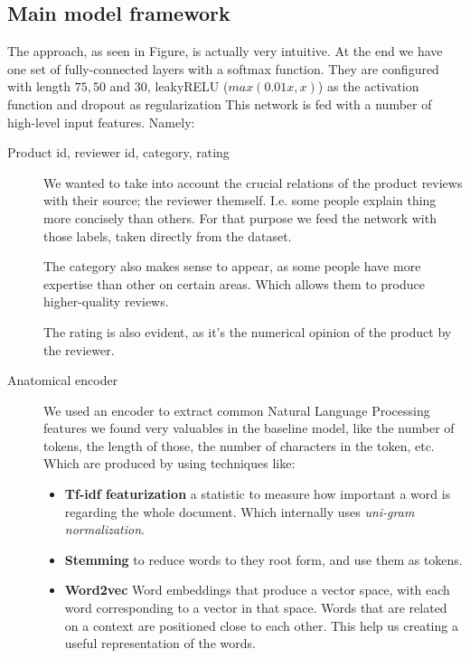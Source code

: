 \documentclass[a4paper,11pt]{article}
\begin{document}
\subsection{Main model framework}\label{sec:main_model_framework}
The approach, as seen in Figure, is actually very intuitive. At the end we have one set of fully-connected layers with a softmax function. They are configured with length $75, 50$ and $30$, leakyRELU ($max(0.01x, x)$) as the activation function and dropout \cite{dropout:JMLR:v15:srivastava14a} as regularization This network is fed with a number of high-level input features. Namely:
\begin{description}
	\item[Product id, reviewer id, category, rating] We wanted to take into account the crucial relations of the product reviews with their source; the reviewer themself. I.e. some people explain thing more concisely than others. For that purpose we feed the network with those labels, taken directly from the dataset.
	
	The category also makes sense to appear, as some people have more expertise than other on certain areas. Which allows them to produce higher-quality reviews.
	
	The rating is also evident, as it's the numerical opinion of the product by the reviewer.
	
	\item[Anatomical encoder] We used an encoder to extract common Natural Language Processing features we found very valuables in the baseline model, like the number of tokens, the length of those, the number of characters in the token, etc. Which are produced by using techniques like:
	\begin{itemize}
		\item \textbf{Tf-idf featurization} \cite{tfidf:Ramos2003UsingTT} a statistic to measure how important a word is regarding the whole document. Which internally uses \textit{uni-gram normalization}.
		\item \textbf{Stemming} to reduce words to they root form, and use them as tokens.
		\item \textbf{Word2vec} \cite{word2vec:DBLP:journals/corr/abs-1301-3781} Word embeddings that produce a vector space, with each word corresponding to a vector in that space. Words that are related on a context are positioned close to each other. This help us creating a useful representation of the words.
	\end{itemize}
	

\end{description}
\end{document}
